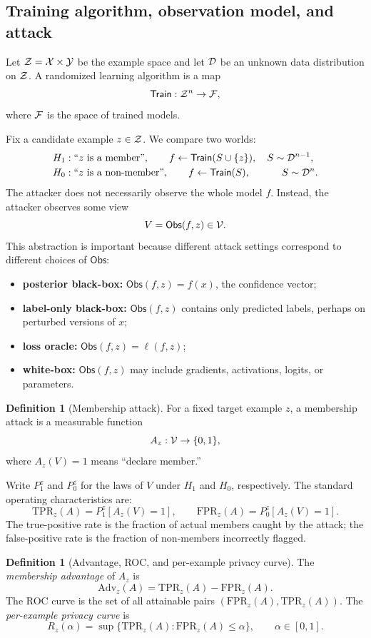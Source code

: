 \documentclass[11pt]{article}
\theoremstyle{definition}
\newtheorem{definition}[theorem]{Definition}
\newcommand{\1}{\mathbf{1}}
\newcommand{\Train}{\mathsf{Train}}
\newcommand{\Obs}{\mathsf{Obs}}
\newcommand{\Loss}{\ell}
\newcommand{\TPR}{\mathrm{TPR}}
\newcommand{\FPR}{\mathrm{FPR}}
\newcommand{\Adv}{\mathrm{Adv}}
\begin{document}
\subsection{Training algorithm, observation model, and attack}

Let ${\cal Z} = {\cal X} \times {\cal Y}$ be the example space and let ${\cal D}$ be an unknown data distribution on ${\cal Z}$. A randomized learning algorithm is a map
\[
\Train : \cZ^n \to \cF,
\]
where ${\cal F}$ is the space of trained models.

Fix a candidate example $z \in {\cal Z}$. We compare two worlds:
\begin{align*}
H_1 &: \text{``$z$ is a member''}, \qquad f \leftarrow \Train(S \cup \{z\}), \quad S \sim \cD^{n-1},\\
H_0 &: \text{``$z$ is a non-member''}, \qquad f \leftarrow \Train(S), \qquad\quad\, S \sim \cD^n.
\end{align*}
The attacker does not necessarily observe the whole model $f$. Instead, the attacker observes some view
\[
V = \Obs(f,z) \in \cV.
\]
This abstraction is important because different attack settings correspond to different choices of $\Obs$:
\begin{itemize}
    \item \textbf{posterior black-box:} $\Obs(f,z) = f(x)$, the confidence vector;
    \item \textbf{label-only black-box:} $\Obs(f,z)$ contains only predicted labels, perhaps on perturbed versions of $x$;
    \item \textbf{loss oracle:} $\Obs(f,z) = \Loss(f,z)$;
    \item \textbf{white-box:} $\Obs(f,z)$ may include gradients, activations, logits, or parameters.
\end{itemize}

\begin{definition}[Membership attack]
For a fixed target example $z$, a membership attack is a measurable function
\[
A_z : {\cal V} \to \{0,1\},
\]
where $A_z(V)=1$ means ``declare member.''
\end{definition}

Write $P_1^z$ and $P_0^z$ for the laws of $V$ under $H_1$ and $H_0$, respectively. The standard operating characteristics are:
\[
\TPR_z(A) = P_1^z[A_z(V)=1],
\qquad
\FPR_z(A) = P_0^z[A_z(V)=1].
\]
The true-positive rate is the fraction of actual members caught by the attack; the false-positive rate is the fraction of non-members incorrectly flagged.

\begin{definition}[Advantage, ROC, and per-example privacy curve]
The \emph{membership advantage} of $A_z$ is
\[
\Adv_z(A) = \TPR_z(A) - \FPR_z(A).
\]
The ROC curve is the set of all attainable pairs $(\FPR_z(A),\TPR_z(A))$. The \emph{per-example privacy curve} is
\[
R_z(\alpha) = \sup\{\TPR_z(A): \FPR_z(A) \le \alpha\}, \qquad \alpha \in [0,1].
\]
\end{definition}
\end{document}
